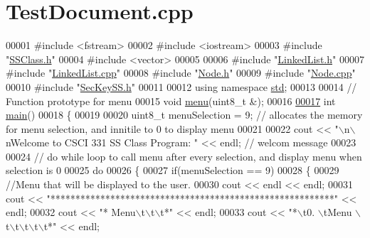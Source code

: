 \hypertarget{TestDocument_8cpp_source}{}\section{Test\+Document.\+cpp}

\begin{DoxyCode}
00001 \textcolor{preprocessor}{#include <fstream>}
00002 \textcolor{preprocessor}{#include <iostream>}
00003 \textcolor{preprocessor}{#include "\hyperlink{SSClass_8h}{SSClass.h}"}
00004 \textcolor{preprocessor}{#include <vector>}
00005 
00006 \textcolor{preprocessor}{#include "\hyperlink{LinkedList_8h}{LinkedList.h}"}
00007 \textcolor{preprocessor}{#include "\hyperlink{LinkedList_8cpp}{LinkedList.cpp}"}
00008 \textcolor{preprocessor}{#include "\hyperlink{Node_8h}{Node.h}"}
00009 \textcolor{preprocessor}{#include "\hyperlink{Node_8cpp}{Node.cpp}"}
00010 \textcolor{preprocessor}{#include "\hyperlink{SecKeySS_8h}{SecKeySS.h}"}
00011 
00012 \textcolor{keyword}{using namespace }\hyperlink{namespacestd}{std};
00013 
00014 \textcolor{comment}{// Function prototype for menu}
00015 \textcolor{keywordtype}{void} \hyperlink{TestDocument_8cpp_a23e4bdfe8835d4c21bff59dfd73e05f5}{menu}(uint8\_t &);
00016 
\hyperlink{TestDocument_8cpp_ae66f6b31b5ad750f1fe042a706a4e3d4}{00017} \textcolor{keywordtype}{int} \hyperlink{TestDocument_8cpp_ae66f6b31b5ad750f1fe042a706a4e3d4}{main}()
00018 \{
00019     
00020     uint8\_t menuSelection = 9;  \textcolor{comment}{// allocates the memory for menu selection, and innitile to 0 to display
       menu}
00021 
00022     cout << \textcolor{stringliteral}{"\(\backslash\)n\(\backslash\)nWelcome to CSCI 331 SS Class Program: "} << endl;   \textcolor{comment}{// welcom message}
00023 
00024     \textcolor{comment}{// do while loop to call menu after every selection, and display menu when selection is 0}
00025     \textcolor{keywordflow}{do}
00026     \{
00027         \textcolor{keywordflow}{if}(menuSelection == 9)
00028         \{
00029             \textcolor{comment}{//Menu that will be displayed to the user.}
00030             cout << endl << endl;
00031             cout << \textcolor{stringliteral}{"*********************************************************"} << endl;
00032             cout << \textcolor{stringliteral}{"*                           Menu\(\backslash\)t\(\backslash\)t\(\backslash\)t*"} << endl;
00033             cout << \textcolor{stringliteral}{"*\(\backslash\)t0. \(\backslash\)tMenu  \(\backslash\)t\(\backslash\)t\(\backslash\)t\(\backslash\)t\(\backslash\)t*"} << endl;

\end{DoxyCode}
